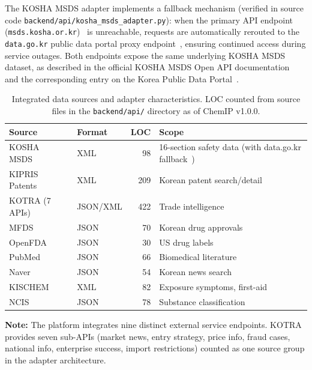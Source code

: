 \documentclass[preprint,12pt]{elsarticle}
\begin{document}
The KOSHA MSDS adapter implements a fallback mechanism (verified in source code \texttt{backend/api/kosha\_msds\_adapter.py}): when the primary API endpoint (\texttt{msds.kosha.or.kr})~\cite{kosha2024} is unreachable, requests are automatically rerouted to the \texttt{data.go.kr} public data portal proxy endpoint~\cite{datagokr2024}, ensuring continued access during service outages. Both endpoints expose the same underlying KOSHA MSDS dataset, as described in the official KOSHA MSDS Open API documentation~\cite{kosha2024} and the corresponding entry on the Korea Public Data Portal~\cite{datagokr2024}.

\begin{table}[htbp]
\centering
\caption{Integrated data sources and adapter characteristics. LOC counted from source files in the \texttt{backend/api/} directory as of ChemIP v1.0.0.}
\label{tab:adapters}
\begin{tabular}{@{}llrl@{}}
\toprule
Source & Format & LOC & Scope \\
\midrule
KOSHA MSDS~\cite{kosha2024}  & XML      &  98 & 16-section safety data (with data.go.kr fallback~\cite{datagokr2024}) \\
KIPRIS Patents               & XML      & 209 & Korean patent search/detail \\
KOTRA (7 APIs)               & JSON/XML & 422 & Trade intelligence \\
MFDS                         & JSON     &  70 & Korean drug approvals \\
OpenFDA~\cite{openfda2024}   & JSON     &  30 & US drug labels \\
PubMed                       & JSON     &  66 & Biomedical literature \\
Naver                        & JSON     &  54 & Korean news search \\
KISCHEM                      & XML      &  82 & Exposure symptoms, first-aid \\
NCIS                         & JSON     &  78 & Substance classification \\
\bottomrule
\end{tabular}
\end{table}

\textbf{Note:} The platform integrates nine distinct external service endpoints. KOTRA provides seven sub-APIs (market news, entry strategy, price info, fraud cases, national info, enterprise success, import restrictions) counted as one source group in the adapter architecture.
\end{document}
